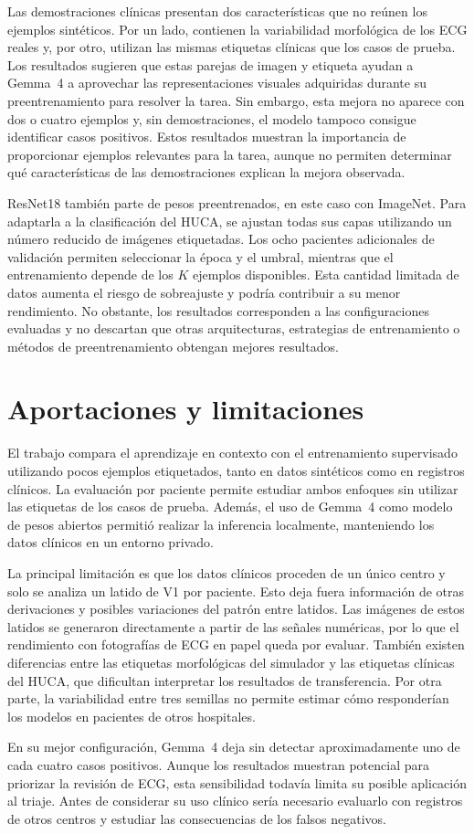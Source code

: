 Las demostraciones clínicas presentan dos características que no reúnen los ejemplos sintéticos. Por un lado, contienen la variabilidad morfológica de los ECG reales y, por otro, utilizan las mismas etiquetas clínicas que los casos de prueba. Los resultados sugieren que estas parejas de imagen y etiqueta ayudan a Gemma~4 a aprovechar las representaciones visuales adquiridas durante su preentrenamiento para resolver la tarea. Sin embargo, esta mejora no aparece con dos o cuatro ejemplos y, sin demostraciones, el modelo tampoco consigue identificar casos positivos. Estos resultados muestran la importancia de proporcionar ejemplos relevantes para la tarea, aunque no permiten determinar qué características de las demostraciones explican la mejora observada.

ResNet18 también parte de pesos preentrenados, en este caso con ImageNet. Para adaptarla a la clasificación del HUCA, se ajustan todas sus capas utilizando un número reducido de imágenes etiquetadas. Los ocho pacientes adicionales de validación permiten seleccionar la época y el umbral, mientras que el entrenamiento depende de los \(K\) ejemplos disponibles. Esta cantidad limitada de datos aumenta el riesgo de sobreajuste y podría contribuir a su menor rendimiento. No obstante, los resultados corresponden a las configuraciones evaluadas y no descartan que otras arquitecturas, estrategias de entrenamiento o métodos de preentrenamiento obtengan mejores resultados.

\section{Aportaciones y limitaciones}
\label{sec:limitaciones}

El trabajo compara el aprendizaje en contexto con el entrenamiento supervisado utilizando pocos ejemplos etiquetados, tanto en datos sintéticos como en registros clínicos. La evaluación por paciente permite estudiar ambos enfoques sin utilizar las etiquetas de los casos de prueba. Además, el uso de Gemma~4 como modelo de pesos abiertos permitió realizar la inferencia localmente, manteniendo los datos clínicos en un entorno privado.

La principal limitación es que los datos clínicos proceden de un único centro y solo se analiza un latido de V1 por paciente. Esto deja fuera información de otras derivaciones y posibles variaciones del patrón entre latidos. Las imágenes de estos latidos se generaron directamente a partir de las señales numéricas, por lo que el rendimiento con fotografías de ECG en papel queda por evaluar. También existen diferencias entre las etiquetas morfológicas del simulador y las etiquetas clínicas del HUCA, que dificultan interpretar los resultados de transferencia. Por otra parte, la variabilidad entre tres semillas no permite estimar cómo responderían los modelos en pacientes de otros hospitales.

En su mejor configuración, Gemma~4 deja sin detectar aproximadamente uno de cada cuatro casos positivos. Aunque los resultados muestran potencial para priorizar la revisión de ECG, esta sensibilidad todavía limita su posible aplicación al triaje. Antes de considerar su uso clínico sería necesario evaluarlo con registros de otros centros y estudiar las consecuencias de los falsos negativos.
